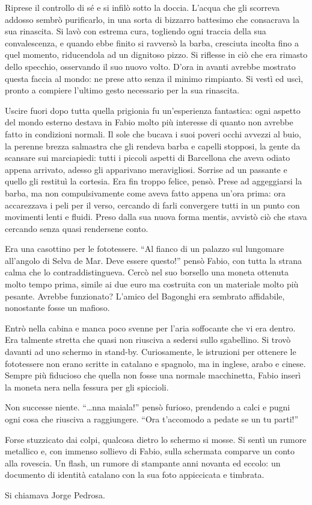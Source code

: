 Riprese il controllo di sé e si infilò sotto la doccia. L'acqua che gli scorreva addosso sembrò purificarlo, in una sorta di bizzarro battesimo che consacrava la sua rinascita. Si lavò con estrema cura, togliendo ogni traccia della sua convalescenza, e quando ebbe finito si ravversò la barba, cresciuta incolta fino a quel momento, riducendola ad un dignitoso pizzo. Si riflesse in ciò che era rimasto dello specchio, osservando il suo nuovo volto. D'ora in avanti avrebbe mostrato questa faccia al mondo: ne prese atto senza il minimo rimpianto. Si vestì ed uscì, pronto a compiere l'ultimo gesto necessario per la sua rinascita.

Uscire fuori dopo tutta quella prigionia fu un'esperienza fantastica: ogni aspetto del mondo esterno destava in Fabio molto più interesse di quanto non avrebbe fatto in condizioni normali. Il sole che bucava i suoi poveri occhi avvezzi al buio, la perenne brezza salmastra che gli rendeva barba e capelli stopposi, la gente da scansare sui marciapiedi: tutti i piccoli aspetti di Barcellona che aveva odiato appena arrivato, adesso gli apparivano meravigliosi. Sorrise ad un passante e quello gli restituì la cortesia. Era fin troppo felice, pensò. Prese ad aggeggiarsi la barba, ma non compulsivamente come aveva fatto appena un'ora prima: ora accarezzava i peli per il verso, cercando di farli convergere tutti in un punto con movimenti lenti e fluidi. Preso dalla sua nuova forma mentis, avvistò ciò che stava cercando senza quasi rendersene conto.

Era una casottino per le fototessere. ``Al fianco di un palazzo sul lungomare all'angolo di Selva de Mar. Deve essere questo!'' pensò Fabio, con tutta la strana calma che lo contraddistingueva. Cercò nel suo borsello una moneta ottenuta molto tempo prima, simile ai due euro ma costruita con un materiale molto più pesante. Avrebbe funzionato? L'amico del Bagonghi era sembrato affidabile, nonostante fosse un mafioso.

Entrò nella cabina e manca poco svenne per l'aria soffocante che vi era dentro. Era talmente stretta che quasi non riusciva a sedersi sullo sgabellino. Si trovò davanti ad uno schermo in stand-by. Curiosamente, le istruzioni per ottenere le fototessere non erano scritte in catalano e spagnolo, ma in inglese, arabo e cinese. Sempre più fiducioso che quella non fosse una normale macchinetta, Fabio inserì la moneta nera nella fessura per gli spiccioli.

Non successe niente. ``\ldots nna maiala!'' pensò furioso, prendendo a calci e pugni ogni cosa che riusciva a raggiungere. ``Ora t'accomodo a pedate se un tu parti!''

Forse stuzzicato dai colpi, qualcosa dietro lo schermo si mosse. Si sentì un rumore metallico e, con immenso sollievo di Fabio, sulla schermata comparve un conto alla rovescia. Un flash, un rumore di stampante anni novanta ed eccolo: un documento di identità catalano con la sua foto appiccicata e timbrata.

Si chiamava Jorge Pedrosa.
